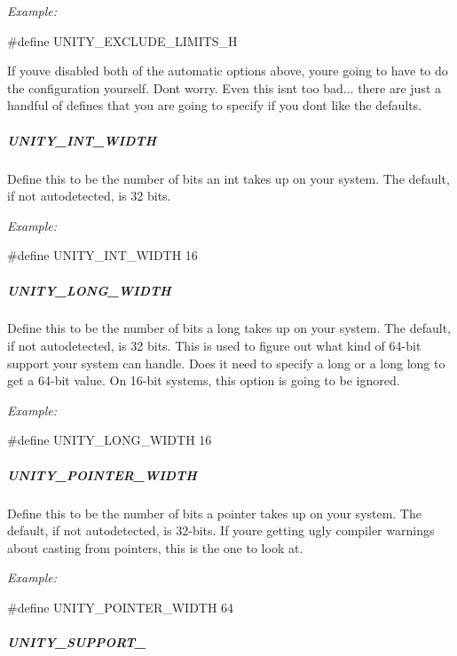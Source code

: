 {\itshape Example\+:} 
\begin{DoxyCode}
\textcolor{preprocessor}{#define UNITY\_EXCLUDE\_LIMITS\_H}
\end{DoxyCode}


If you\textquotesingle{}ve disabled both of the automatic options above, you\textquotesingle{}re going to have to do the configuration yourself. Don\textquotesingle{}t worry. Even this isn\textquotesingle{}t too bad... there are just a handful of defines that you are going to specify if you don\textquotesingle{}t like the defaults.

\subparagraph*{{\ttfamily U\+N\+I\+T\+Y\+\_\+\+I\+N\+T\+\_\+\+W\+I\+D\+TH}}

Define this to be the number of bits an {\ttfamily int} takes up on your system. The default, if not autodetected, is 32 bits.

{\itshape Example\+:} 
\begin{DoxyCode}
\textcolor{preprocessor}{#define UNITY\_INT\_WIDTH 16}
\end{DoxyCode}


\subparagraph*{{\ttfamily U\+N\+I\+T\+Y\+\_\+\+L\+O\+N\+G\+\_\+\+W\+I\+D\+TH}}

Define this to be the number of bits a {\ttfamily long} takes up on your system. The default, if not autodetected, is 32 bits. This is used to figure out what kind of 64-\/bit support your system can handle. Does it need to specify a {\ttfamily long} or a {\ttfamily long long} to get a 64-\/bit value. On 16-\/bit systems, this option is going to be ignored.

{\itshape Example\+:} 
\begin{DoxyCode}
\textcolor{preprocessor}{#define UNITY\_LONG\_WIDTH 16}
\end{DoxyCode}


\subparagraph*{{\ttfamily U\+N\+I\+T\+Y\+\_\+\+P\+O\+I\+N\+T\+E\+R\+\_\+\+W\+I\+D\+TH}}

Define this to be the number of bits a pointer takes up on your system. The default, if not autodetected, is 32-\/bits. If you\textquotesingle{}re getting ugly compiler warnings about casting from pointers, this is the one to look at.

{\itshape Example\+:} 
\begin{DoxyCode}
\textcolor{preprocessor}{#define UNITY\_POINTER\_WIDTH 64}
\end{DoxyCode}


\subparagraph*{{\ttfamily U\+N\+I\+T\+Y\+\_\+\+S\+U\+P\+P\+O\+R\+T\+\_}}

